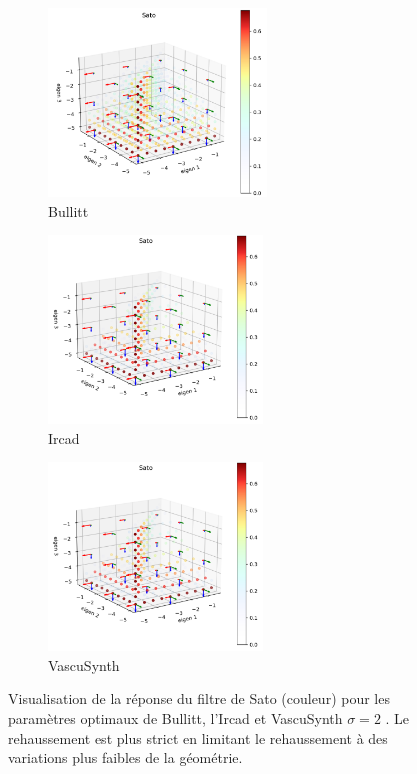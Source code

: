 \begin{figure}[H]
  \centering
  \begin{subfigure}[t]{0.45\textwidth}
    \includegraphics[height=5cm]{Images/Bullitt_Sato_BP.png}
    \caption{Bullitt}
  \end{subfigure}
  \begin{subfigure}[t]{0.45\textwidth}
    \includegraphics[height=5cm]{Images/Ircad_Sato_BP.png}
    \caption{Ircad}
  \end{subfigure}
  
  \begin{subfigure}[t]{0.45\textwidth}
    \includegraphics[height=5cm]{Images/Ircad_Sato_BP.png}
    \caption{VascuSynth}
  \end{subfigure}
  \caption{Visualisation de la réponse du filtre de Sato (couleur) pour les paramètres optimaux de Bullitt, l'Ircad et VascuSynth $\sigma=2$ . Le rehaussement est plus strict en limitant le rehaussement à des variations plus faibles de la géométrie.}
  \label{fig:exemple_geometry_Sato}
\end{figure}

